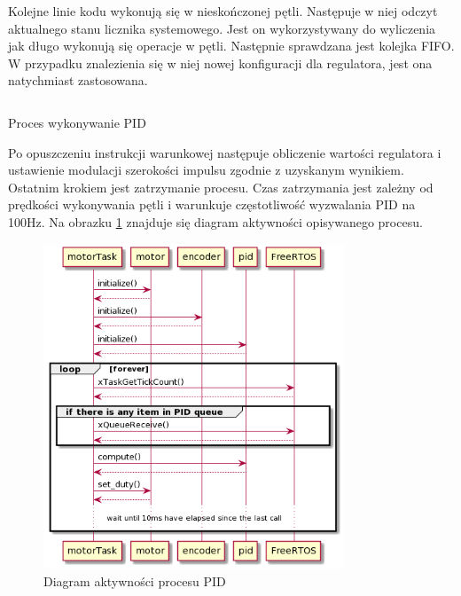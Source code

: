         Kolejne linie kodu wykonują się w nieskończonej pętli. Następuje w niej odczyt aktualnego stanu licznika systemowego. Jest on wykorzystywany do wyliczenia jak długo wykonują się operacje w pętli. Następnie sprawdzana jest kolejka FIFO. W przypadku znalezienia się w niej nowej konfiguracji dla regulatora, jest ona natychmiast zastosowana. 
        
        \begin{kod}
          \inputminted[firstline=58]{cpp}{esp/listings/pid.cpp}
          \caption{Proces wykonywanie PID}
          \label{code:pid_task}
          \vspace{2em}
        \end{kod}
        
        Po opuszczeniu instrukcji warunkowej następuje obliczenie wartości regulatora i ustawienie modulacji szerokości impulsu zgodnie z uzyskanym wynikiem. Ostatnim krokiem jest zatrzymanie procesu. Czas zatrzymania jest zależny od prędkości wykonywania pętli i warunkuje częstotliwość wyzwalania PID na 100Hz. Na obrazku \ref{fig:pid_plantuml} znajduje się diagram aktywności opisywanego procesu.
        
                      
        \begin{figure}[ht]
            \centering
            \includegraphics[width=0.8\textwidth]{img/motorTask_uml.png}
            \caption{Diagram aktywności procesu PID}
            \label{fig:pid_plantuml}
        \end{figure}
